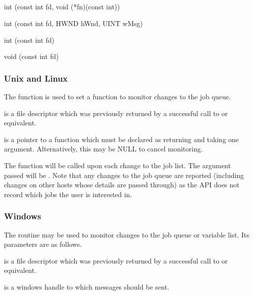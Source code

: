 \subsection{\funcnameXBjobmon{}}

\begin{expara}

int \funcnameXBjobmon{}(const int fd, void (*fn)(const int))

\bigskip


int \funcnameXBsetmon{}(const int fd, HWND hWnd, UINT wMsg)

\bigskip


int \funcnameXBprocmon{}(const int fd)

\bigskip


void \funcnameXBunsetmon{}(const int fd)

\end{expara}

\subsubsection{Unix and Linux}
The function \funcXBjobmon{} is used to set a function
to monitor changes to the job queue.

 is a file descriptor which was previously
returned by a successful call to \funcXBopen{} or equivalent.

 is a pointer to a function which must be
declared as returning  and taking one
 argument. Alternatively, this may be NULL
to cancel monitoring.

The function  will be called upon each change
to the job list. The argument passed will be .
Note that any changes to the job queue are reported (including changes
on other hosts whose details are passed through) as the API does not
record which jobs the user is interested in.

\subsubsection{Windows}
\label{bkm:xbsetmon}The \funcXBsetmon{} routine may be
used to monitor changes to the job queue or variable list. Its
parameters are as follows.

 is a file descriptor which was previously
returned by a successful call to \funcXBopen{} or equivalent.

 is a windows handle to which messages should
be sent.

